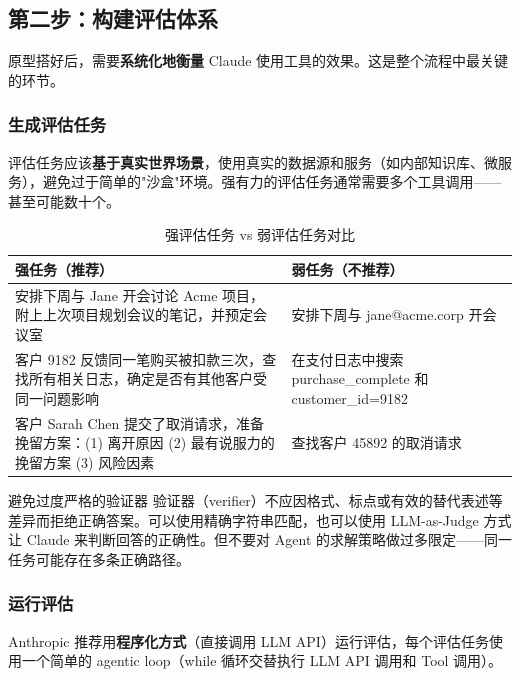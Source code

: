 \documentclass[a4paper]{article}
\begin{document}
\subsection{第二步：构建评估体系}

原型搭好后，需要\textbf{系统化地衡量} Claude 使用工具的效果。这是整个流程中最关键的环节。

\subsubsection{生成评估任务}

评估任务应该\textbf{基于真实世界场景}，使用真实的数据源和服务（如内部知识库、微服务），避免过于简单的"沙盒"环境。强有力的评估任务通常需要多个工具调用——甚至可能数十个。

\begin{table}[H]
\centering
\caption{强评估任务 vs 弱评估任务对比}
\begin{tabular}{p{}p{}}
\toprule
\textbf{强任务（推荐）} & \textbf{弱任务（不推荐）} \\
\midrule
安排下周与 Jane 开会讨论 Acme 项目，附上上次项目规划会议的笔记，并预定会议室 & 安排下周与 jane@acme.corp 开会 \\
\midrule
客户 9182 反馈同一笔购买被扣款三次，查找所有相关日志，确定是否有其他客户受同一问题影响 & 在支付日志中搜索 purchase\_complete 和 customer\_id=9182 \\
\midrule
客户 Sarah Chen 提交了取消请求，准备挽留方案：(1) 离开原因 (2) 最有说服力的挽留方案 (3) 风险因素 & 查找客户 45892 的取消请求 \\
\bottomrule
\end{tabular}
\end{table}

\begin{warningbox}{避免过度严格的验证器}
验证器（verifier）不应因格式、标点或有效的替代表述等差异而拒绝正确答案。可以使用精确字符串匹配，也可以使用 LLM-as-Judge 方式让 Claude 来判断回答的正确性。但不要对 Agent 的求解策略做过多限定——同一任务可能存在多条正确路径。
\end{warningbox}

\subsubsection{运行评估}

Anthropic 推荐用\textbf{程序化方式}（直接调用 LLM API）运行评估，每个评估任务使用一个简单的 agentic loop（while 循环交替执行 LLM API 调用和 Tool 调用）。
\end{document}
